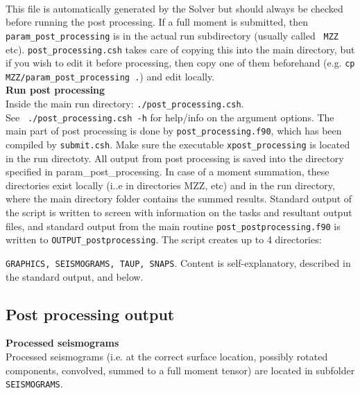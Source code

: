 \documentclass[11pt,letter,fleqn,english,notitlepage]{article}
\begin{document}
\lstset{frame=single,basicstyle=\footnotesize, breaklines=true }


\\
This file is automatically generated by the Solver but should always be checked
before running the post processing.  If a full moment is submitted, then {\tt
param\_post\_processing} is in the actual run subdirectory (usually called {\tt
MZZ} etc).  {\tt post\_processing.csh} takes care of copying this into the main
directory, but if you wish to edit it before processing, then copy one of them
beforehand (e.g. {\tt cp MZZ/param\_post\_processing .}) and edit locally.\\


\noindent \textbf{Run post processing}\\
Inside the main run directory: {\tt ./post\_processing.csh}.\\ See {\tt
./post\_processing.csh -h} for help/info on the argument options. The main part
of post processing is done by {\tt post\_processing.f90}, which has been
compiled by {\tt submit.csh}. Make sure the executable {\tt xpost\_processing}
is located in the run directoty.  All output from post processing is saved into
the directory specified in param\_post\_processing.  In case of a moment
summation, these directories exist locally (i..e in directories MZZ, etc) and
in the run directory, where the main directory folder contains the summed
results. Standard output of the script is written to screen with information on
the tasks and resultant output files, and standard output from the main routine
{\tt post\_postprocessing.f90} is written to {\tt OUTPUT\_postprocessing}. The
script creates up to 4 directories: 

{\tt GRAPHICS, SEISMOGRAMS, TAUP, SNAPS}. 
Content is self-explanatory, described in the standard output, and below.
\newpage
\subsection{Post processing output}

\noindent \textbf{Processed seismograms}\\
Processed seismograms (i.e. at the correct surface location, possibly rotated
components, convolved, summed to a full moment tensor) are located in subfolder
{\tt SEISMOGRAMS}.\\
\end{document}
